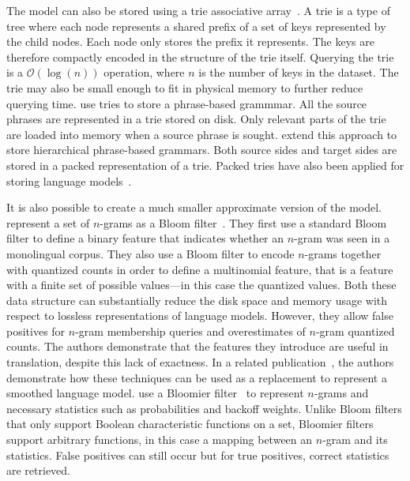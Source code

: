 The model can also be stored using a trie associative
array~\citep{fredkin:1960:ACM}. A trie is a type of tree where each node
represents a shared prefix of a set of keys represented by the child nodes. Each
node only stores the prefix it represents. The keys are therefore compactly
encoded in the structure of the trie itself. Querying the trie is a
$\mathcal{O}(\log(n))$ operation, where $n$ is the number of keys in the
dataset. The trie may also be small enough to fit in physical memory to further
reduce querying time. \citet{zens-ney:2007:HLTNAACL} use tries
to store a phrase-based grammmar. All the source phrases are represented
in a trie stored on disk. Only relevant parts of the trie are loaded into
memory when a source phrase is sought.
\citet{ganitkevitch-cao-weese-post-callisonburch:2012:WMT} extend this
approach to store hierarchical phrase-based grammars. Both
source sides and target sides are stored in a packed representation of a trie.
Packed tries have also been applied for storing language
models~\citep{pauls-klein:2011:HLTACL,heafield:2011:WMT}.

It is also possible to create a much smaller approximate version of the model.
\citet{talbot-osborne:2007:ACL} represent a set of $n$-grams as a Bloom
filter~\citep{bloom:1970:ACM}.
They first use a standard Bloom filter to define a binary feature that
indicates whether an $n$-gram was seen in a monolingual corpus. They
also use a Bloom filter to encode $n$-grams together with quantized counts
in order to define a multinomial feature, that is a feature
with a finite set of possible values---in this case the quantized values. Both these data structure can
substantially reduce the disk space and memory usage with respect to lossless
representations of language models. However, they allow
false positives for $n$-gram
membership queries and overestimates of $n$-gram quantized counts. The authors
demonstrate that the features they introduce are useful in translation, despite
this lack of exactness.
In a related publication~\citep{talbot-osborne:2007:EMNLP-CoNLL}, the authors
demonstrate how these techniques can be used as a replacement to represent
a smoothed language model. \citet{talbot-brants:2008:ACL} use a Bloomier
filter~\citep{chazelle-kilian-rubinfeld-tal:2004:ACM-SIAM}
to represent $n$-grams and necessary statistics such as probabilities and backoff
weights. Unlike Bloom filters that only support Boolean characteristic
functions on a set, Bloomier filters support arbitrary functions, in this case
a mapping between an $n$-gram and its statistics. False positives can still occur
but for true positives, correct statistics are retrieved.

